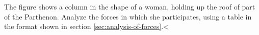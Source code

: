 The figure shows a column in the shape of a woman, holding
up the roof of part of the Parthenon. Analyze the forces in which she participates,
using a table in the format shown in section \ref{sec:analysis-of-forces}.<%
